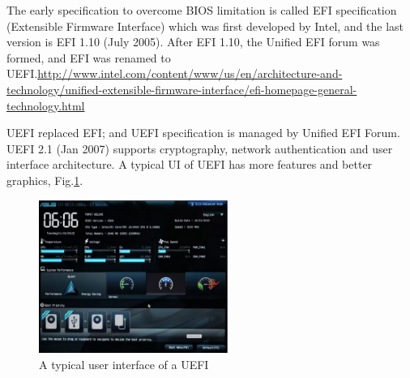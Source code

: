 The early specification to overcome BIOS limitation is called EFI specification
(Extensible Firmware Interface) which was first developed by Intel, and the last
version is EFI 1.10 (July 2005).  After EFI 1.10, the Unified EFI forum was formed, and EFI was
renamed to
UEFI.\url{http://www.intel.com/content/www/us/en/architecture-and-technology/unified-extensible-firmware-interface/efi-homepage-general-technology.html}

UEFI replaced EFI; and UEFI specification is managed by Unified EFI Forum. UEFI
2.1 (Jan 2007) supports cryptography, network authentication and user interface
architecture. A typical UI of UEFI has more features and better graphics,
Fig.\ref{fig:UEFI_interface}.

\begin{figure}[hbt]
  \centerline{\includegraphics[height=5cm,
    angle=0]{./images/UEFI_interface.eps}}
  \caption{A typical user interface of a UEFI}
  \label{fig:UEFI_interface}
\end{figure}

